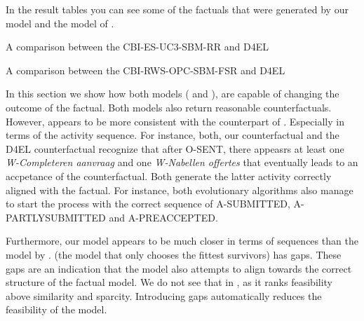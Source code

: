 \documentclass[./../../paper.tex]{subfiles}
\begin{document}
In the result tables you can see some of the factuals that were generated by our model and the model of \autocite{hsieh_DiCE4ELInterpretingProcess_2021}.  

\begin{table}
    \centering    
    \resizebox{\linewidth}{!}{
    
    }
    \caption{A comparison between the CBI-ES-UC3-SBM-RR and D4EL}
    \label{fig:exp7-RR}
\end{table}
\begin{table}
    \centering    
    \resizebox{\linewidth}{!}{
    
    }
\caption{A comparison between the CBI-RWS-OPC-SBM-FSR and D4EL}
\label{fig:exp7-FSR}
\end{table}

% 

% 

% 

In this section we show how both models ( and ), are capable of changing the outcome of the factual. Both models also return reasonable counterfactuals. However,  appears to be more consistent with the counterpart of \autocite{hsieh_DiCE4ELInterpretingProcess_2021}. Especially in terms of the activity sequence. 
For instance, both, our counterfactual and the D4EL counterfactual recognize that after O-SENT, there appeasrs at least one \emph{W-Completeren aanvraag} and one \emph{W-Nabellen offertes} that eventually leads to an accpetance of the counterfactual. Both generate the latter activity correctly aligned with the factual. 
For instance, both evolutionary algorithms also manage to start the process with the correct sequence of A-SUBMITTED, A-PARTLYSUBMITTED and A-PREACCEPTED. 

Furthermore, our model appears to be much closer in terms of sequences than the model by \citeauthor{hsieh_DiCE4ELInterpretingProcess_2021}.  (the model that only chooses the fittest survivors) has gaps. These gaps are an indication that the model also attempts to align towards the correct structure of the factual model. We do not see that in , as it ranks feasibility above similarity and sparcity. Introducing gaps automatically reduces the feasibility of the model. 
\end{document}
